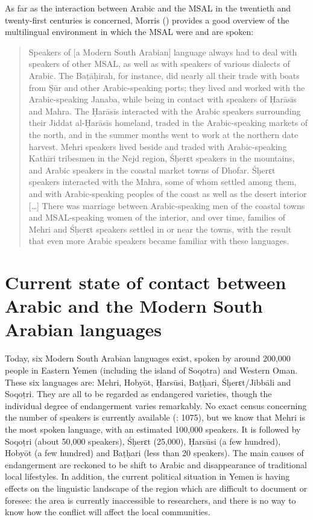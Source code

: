 \documentclass[output=paper]{langsci/langscibook}
\begin{document}
As far as the interaction between Arabic and the MSAL in the twentieth and twenty-first centuries is concerned, Morris (\citeyear[25]{Morris2017}) provides a good overview of the multilingual environment in which the MSAL were and are spoken: 

\begin{quote}
Speakers of [a Modern South Arabian] language always had to deal with speakers of other MSAL, as well as with speakers of various dialects of Arabic. The Baṭāḥirah, for instance, did nearly all their trade with boats from Ṣūr and other Arabic-speaking ports; they lived and worked with the Arabic-speaking Janaba, while being in contact with speakers of Ḥarāsīs and Mahra. The Ḥarāsīs interacted with the Arabic speakers surrounding their Jiddat al-Ḥarāsīs homeland, traded in the Arabic-speaking markets of the north, and in the summer months went to work at the northern date harvest. Mehri speakers lived beside and traded with Arabic-speaking Kathīri tribesmen in the Nejd region, Śḥerɛt speakers in the mountains, and Arabic speakers in the coastal market towns of Dhofar. Śḥerɛt speakers interacted with the Mahra, some of whom settled among them, and with Arabic-speaking peoples of the coast as well as the desert interior […] There was marriage between Arabic-speaking men of the coastal towns and MSAL-speaking women of the interior, and over time, families of Mehri and Śḥerɛt speakers settled in or near the towns, with the result that even more Arabic speakers became familiar with these languages.
\end{quote}

\section{Current state of contact between Arabic and the Modern South Arabian languages}\label{sec:2}

Today, six Modern South Arabian languages exist, spoken by around 200,000 people in Eastern Yemen (including the island of Soqotra) and Western Oman. These six languages are: Mehri, Hobyōt, Ḥarsūsi, Baṭḥari, Śḥerɛt/Jibbāli and Soqoṭri. They are all to be regarded as endangered varieties, though the individual degree of endangerment varies remarkably. No exact census concerning the number of speakers is currently available (\citealt{Simeone-Senelle2011}: 1075), but we know that Mehri is the most spoken language, with an estimated 100,000 speakers. It is followed by Soqoṭri (about 50,000 speakers), Śḥerɛt (25,000), Ḥarsūsi (a few hundred), Hobyōt (a few hundred) and Baṭḥari (less than 20 speakers). The main causes of endangerment are reckoned to be shift to Arabic and disappearance of traditional local lifestyles. In addition, the current political situation in Yemen is having effects on the linguistic landscape of the region which are difficult to document or foresee: the area is currently inaccessible to researchers, and there is no way to know how the conflict will affect the local communities.
\end{document}
